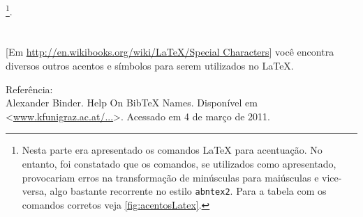 \begin{anexosenv}
\footnote{Nesta parte era apresentado os comandos \LaTeX{} para acentuação. No entanto, foi constatado que os comandos, se utilizados como apresentado, provocariam erros na transformação de  minúsculas para maiúsculas e vice-versa, algo bastante recorrente no estilo \texttt{abntex2}. Para a tabela com os comandos corretos veja \autoref{fig:acentosLatex}.}.
\\
\\
\\

[Em \href{http://en.wikibooks.org/wiki/LaTeX/Special_Characters}{http://en.wikibooks.org/wiki/LaTeX/Special\underline{ }Characters}] você encontra diversos outros acentos e símbolos para serem utilizados no LaTeX.


Referência:\\

Alexander Binder. Help On BibTeX Names. Disponível em <\href{www.kfunigraz.ac.at/~binder/texhelp/bibtx-23.html}{www.kfunigraz.ac.at/...}>. Acessado em 4 de março de 2011.


\end{anexosenv}